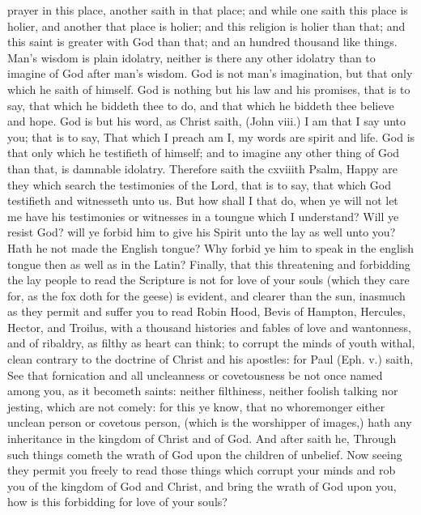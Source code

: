 prayer in this place, another saith in that place;
and while one saith this place is holier, and 
another that place is holier; and this religion is 
holier than that; and this saint is greater with 
God than that; and an hundred thousand like 
things. Man's wisdom is plain idolatry, neither 
is there any other idolatry than to imagine of God 
after man's wisdom. God is not man's imagination, 
but that only which he saith of himself. God is 
nothing but his law and his promises, that is to say, 
that which he biddeth thee to do, and that which 
he biddeth thee believe and hope. God is but his 
word, as Christ saith, (John viii.) I am that I say 
unto you; that is to say, That which I preach am 
I, my words are spirit and life. God is that only 
which he testifieth of himself; and to imagine any 
other thing of God than that, is damnable idolatry. 
Therefore saith the cxviiith Psalm, Happy are 
they which search the testimonies of the Lord, 
that is to say, that which God testifieth and witnesseth
unto us. But how shall I that do, when ye 
will not let me have his testimonies or witnesses 
in a toungue which I understand? Will ye resist 
God? will ye forbid him to give his Spirit unto 
the lay as well unto you? Hath he not made the 
English tongue? Why forbid ye him to speak in 
the english tongue then as well as in the Latin?
Finally, that this threatening and forbidding the 
lay people to read the Scripture is not for love of 
your souls (which they care for, as the fox doth 
for the geese) is evident, and clearer than the 
sun, inasmuch as they permit and suffer you to read 
Robin Hood, Bevis of Hampton, Hercules, Hector, 
and Troilus, with a thousand histories and fables of 
love and wantonness, and of ribaldry, as filthy as 
heart can think; to corrupt the minds of youth 
withal, clean contrary to the doctrine of Christ 
and his apostles: for Paul (Eph. v.) saith, See 
that fornication and all uncleanness or covetousness
be not once named among you, as it 
becometh saints: neither filthiness, neither foolish 
talking nor jesting, which are not comely: for 
this ye know, that no whoremonger either unclean 
person or covetous person, (which is the worshipper
of images,) hath any inheritance in the 
kingdom of Christ and of God. And after saith 
he, Through such things cometh the wrath of God 
upon the children of unbelief. Now seeing they 
permit you freely to read those things which corrupt
your minds and rob you of the kingdom of 
God and Christ, and bring the wrath of God upon
you, how is this forbidding for love of your 
souls?

